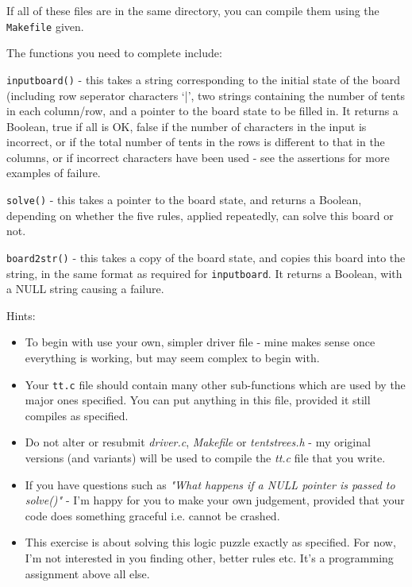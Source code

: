 \begin{exercise}
\noindent If all of these files are in the same directory, you can
compile them using the \verb^Makefile^ given.

\noindent The functions you need to complete include:

\verb^inputboard()^ - this takes a string corresponding to the initial
state of the board (including row seperator characters `|',
two strings containing the number of tents in each
column/row, and a pointer to the board state to be filled in. It returns
a Boolean, true if all is OK, false if the number of characters in the
input is incorrect, or if the total number of tents in the rows is
different to that in the columns, or if incorrect characters have been
used - see the assertions for more examples of failure.

\verb^solve()^ - this takes a pointer to the board state, and returns
a Boolean, depending on whether the five rules, applied repeatedly,
can solve this board or not.

\verb^board2str()^ - this takes a copy of the board state, and
copies this board into the string, in the same format as required for
\verb^inputboard^. It returns a Boolean, with a NULL string causing
a failure.

\noindent Hints:
\begin{itemize}

\item To begin with use your own, simpler driver file - mine makes sense
once everything is working, but may seem complex to begin with.

\item Your \verb^tt.c^ file should contain many other sub-functions
which are used by the major ones specified. You can put anything in this
file, provided it still compiles as specified.

\item Do not alter or resubmit {\em driver.c}, {\em Makefile} or
{\em tentstrees.h} - my original versions (and variants) will be
used to compile the {\em tt.c} file that you write.

\item If you have questions such as {\em "What happens if a NULL pointer is passed
to solve()"} - I'm happy for you to make your own judgement, provided that your code
does something graceful i.e. cannot be crashed.

\item This exercise is about solving this logic puzzle exactly as specified.
For now, I'm not interested in you finding other, better rules etc. It's a programming assignment
above all else.

\end{itemize}

\end{exercise}
